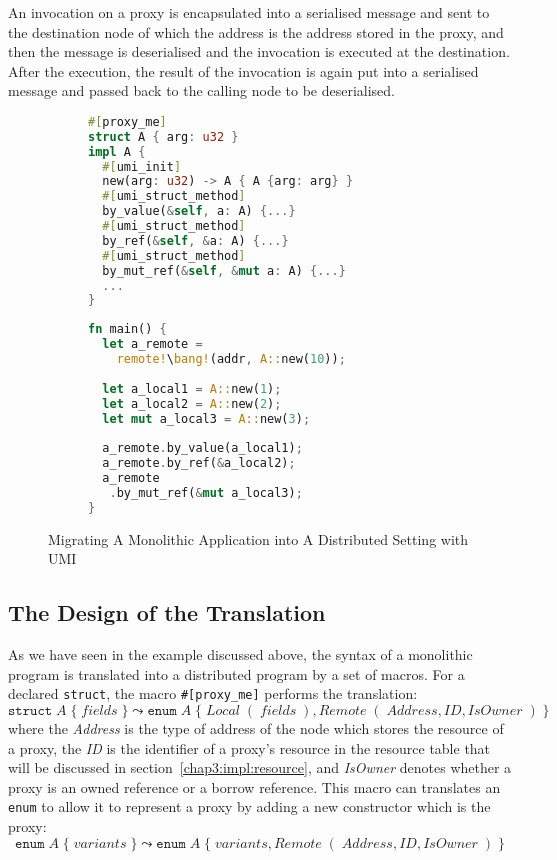 An invocation on a proxy is encapsulated into a serialised message and sent to the destination node of which the address is the address stored in the proxy, and then the message is deserialised and the invocation is executed at the destination. After the execution, the result of the invocation is again put into a serialised message and passed back to the calling node to be deserialised.
\begin{figure}[t]
\centering
\begin{subfigure}[t]{0.53\textwidth}
    \centering
\begin{lstlisting}[language=Rust, style=boxed]
#[proxy_me]
struct A { arg: u32 }
impl A {
  #[umi_init]
  new(arg: u32) -> A { A {arg: arg} }
  #[umi_struct_method]
  by_value(&self, a: A) {...}
  #[umi_struct_method]
  by_ref(&self, &a: A) {...}
  #[umi_struct_method]
  by_mut_ref(&self, &mut a: A) {...}
  ...
}
\end{lstlisting}
\end{subfigure}
\hfill
\begin{subfigure}[t]{0.45\textwidth}
    \centering
\begin{lstlisting}[language=Rust, style=boxed]
fn main() {
  let a_remote = 
    remote!\bang!(addr, A::new(10));
  
  let a_local1 = A::new(1);
  let a_local2 = A::new(2);
  let mut a_local3 = A::new(3);
  
  a_remote.by_value(a_local1);
  a_remote.by_ref(&a_local2);
  a_remote
   .by_mut_ref(&mut a_local3);
}
\end{lstlisting}
\end{subfigure}
\vspace{1em}
\caption{Migrating A Monolithic Application into A Distributed Setting with UMI}
\label{chap3:impl:overview:fig}
\end{figure}

\subsection{The Design of the Translation}
\label{chap3:impl:proxy}
As we have seen in the example discussed above, the syntax of a monolithic program is translated into a distributed program by a set of macros. For a declared \lstinline{struct}, the macro \lstinline{#[proxy_me]} performs the translation:
\[
\texttt{struct}\; A\;\{\; \mathit{fields}\;\} \leadsto \texttt{enum}\; A\;\{\; \mathit{Local}\;(\;\mathit{fields}\;), \mathit{Remote}\;(\;\mathit{Address}, \mathit{ID}, \mathit{IsOwner}\;)\;\} 
\]
where the \textit{Address} is the type of address of the node which stores the resource of a proxy, the \textit{ID} is the identifier of a proxy's resource in the resource table that will be discussed in section~\ref{chap3:impl:resource}, and \textit{IsOwner} denotes whether a proxy is an owned reference or a borrow reference.
This macro can translates an \lstinline{enum} to allow it to represent a proxy by adding a new constructor which is the proxy:
\[
\texttt{enum}\; A\;\{\; \mathit{variants}\;\} \leadsto \texttt{enum}\; A\;\{\; \mathit{variants}, \mathit{Remote}\;(\;\mathit{Address}, \mathit{ID}, \mathit{IsOwner}\;)\;\} 
\]

